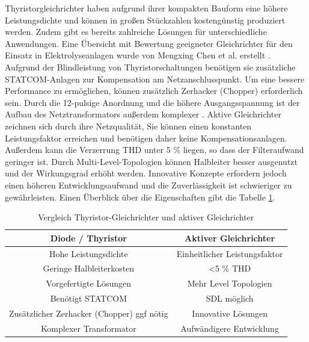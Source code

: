 Thyristorgleichrichter haben aufgrund ihrer kompakten Bauform eine höhere Leistungsdichte und können in großen Stückzahlen kostengünstig produziert werden. Zudem gibt es bereits zahlreiche Lösungen für unterschiedliche Anwendungen. Eine Übersicht mit Bewertung geeigneter Gleichrichter für den Einsatz in Elektrolyseanlagen wurde von Mengxing Chen et al. erstellt \cite{HydrogenElectronicTopologies}. Aufgrund der Blindleistung von Thyristorschaltungen benötigen sie zusätzliche STATCOM-Anlagen zur Kompensation am Netzanschlusspunkt. Um eine bessere Performance zu ermöglichen, können zusätzlich Zerhacker (Chopper) erforderlich sein. Durch die 12-pulsige Anordnung und die höhere Ausgangsspannung ist der Aufbau des Netztransformators außerdem komplexer \cite{HydrogenRectInf}. Aktive Gleichrichter zeichnen sich durch ihre Netzqualität, Sie können einen konstanten Leistungsfaktor erreichen und benötigen daher keine Kompensationsanlagen. Außerdem kann die Verzerrung \gls{THD} unter 5 \% liegen, so dass der Filteraufwand geringer ist. Durch Multi-Level-Topologien können Halbleiter besser ausgenutzt und der Wirkungsgrad erhöht werden. Innovative Konzepte erfordern jedoch einen höheren Entwicklungsaufwand und die Zuverlässigkeit ist schwieriger zu gewährleisten. Einen Überblick über die Eigenschaften gibt die Tabelle \ref{tab:thyVSafe}.\\
	\begin{table} [H]
		\centering
		\caption{Vergleich Thyristor-Gleichrichter und aktiver Gleichrichter}
		\label{tab:thyVSafe}
		\begin{tabular}{|c|c|} 
			\hline
			\textbf{Diode / Thyristor} & \textbf{Aktiver Gleichrichter} \\
			\hline
			Hohe Leistungsdichte & Einheitlicher Leistungsfaktor \\
			\hline
			Geringe Halbleiterkosten & <5 \% \gls{THD} \\
			\hline
			Vorgefertigte Lösungen & Mehr Level Topologien  \\
			\hline
			Benötigt STATCOM &  \gls{SDL} möglich \\
			\hline
			Zusätzlicher Zerhacker (Chopper) ggf  nötig & Innovative Lösungen \\
			\hline
			Komplexer Transformator & Aufwändigere Entwicklung \\
			\hline
		\end{tabular}
	\end{table}
